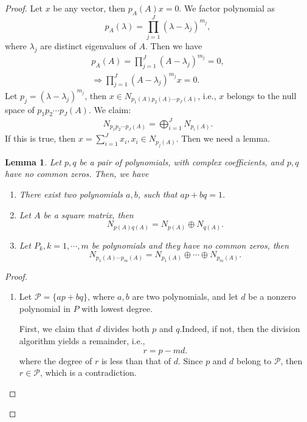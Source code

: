 \documentclass[11pt]{book}
\newtheorem{lemma}[theorem]{Lemma}
\theoremstyle{definition}
\numberwithin{equation}{chapter}
\begin{document}
\begin{proof}
Let $x$ be any vector, then $p_A(A)x = 0$. We factor polynomial as $$p_A(\lambda) = \prod^J_{j=1}\left(\lambda - \lambda_j\right)^{m_j},$$ where $\lambda_j$ are distinct eigenvalues of $A$. Then we have
\begin{align*}
    p_A(A) = \prod^J_{j=1}\left(A - \lambda_j\right)^{m_j} = 0, \\
    \Rightarrow \prod^J_{j=1}\left(A - \lambda_j\right)^{m_j}x = 0.
\end{align*}
Let $p_j = \left(\lambda - \lambda_j\right)^{m_j}$, then $x\in N_{p_1(A)p_2(A)\cdots p_J(A)}$, i.e., $x$ belongs to the null space of $p_1 p_2 \cdots p_J(A)$. We claim: 
\begin{align*}
    N_{p_1p_2\cdots p_J(A)} = \bigoplus^J_{i=1} N_{p_i(A)}.
\end{align*}
If this is true, then $x = \sum^J_{i=1}x_i, x_i\in N_{p_j(A)}$. Then we need a lemma.

\begin{lemma}
Let $p, q$ be a pair of polynomials, with complex coefficients, and $p,q$ have no common zeros. Then, we have
\begin{enumerate}[label=(\alph*)]
    \item There exist two polynomials $a,b$, such that $ap+bq = 1$.
    \item Let $A$ be a square matrix, then 
    $$N_{p(A)q(A)} = N_{p(A)} \oplus N_{q(A)}.$$
    \item Let $P_k, k = 1, \cdots, m$ be polynomials and they have no common zeros, then 
    $$N_{p_1(A)\cdots p_m(A)} = N_{p_1(A)} \oplus\cdots\oplus N_{p_m(A)}.$$
\end{enumerate}
\end{lemma}
\begin{proof}
~\begin{enumerate}[label=(\alph*)]
    \item Let $\mathcal{P} = \{ap+bq\}$, where $a,b$ are two polynomials, and let $d$ be a nonzero polynomial in $P$ with lowest degree. 
    
    First, we claim that $d$ divides both $p$ and $q$.Indeed, if not, then the division algorithm yields a remainder, i.e.,
    $$r = p - md.$$
    where the degree of $r$ is less than that of $d$. Since $p$ and $d$ belong to $\mathcal{P}$, then $r\in \mathcal{P}$, which is a contradiction. 
    

\end{enumerate}
\end{proof}
\end{proof}
\end{document}
